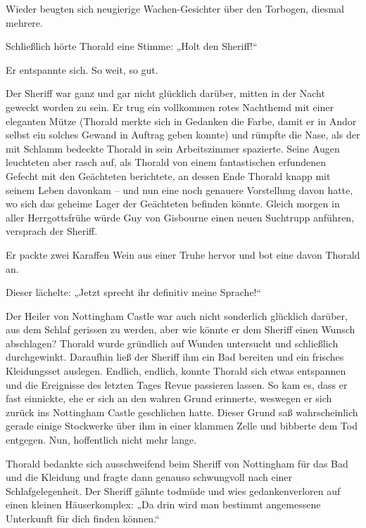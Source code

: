 Wieder beugten sich neugierige Wachen-Gesichter über den Torbogen, diesmal mehrere.

Schließlich hörte Thorald eine Stimme: „Holt den Sheriff!“

Er entspannte sich. So weit, so gut.



\trennzeichen



Der Sheriff war ganz und gar nicht glücklich darüber, mitten in der Nacht geweckt worden zu sein. Er trug ein vollkommen rotes Nachthemd mit einer eleganten Mütze (Thorald merkte sich in Gedanken die Farbe, damit er in Andor selbst ein solches Gewand in Auftrag geben konnte) und rümpfte die Nase, als der mit Schlamm bedeckte Thorald in sein Arbeitszimmer spazierte. Seine Augen leuchteten aber rasch auf, als Thorald von einem fantastischen erfundenen Gefecht mit den Geächteten berichtete, an dessen Ende Thorald knapp mit seinem Leben davonkam – und nun eine noch genauere Vorstellung davon hatte, wo sich das geheime Lager der Geächteten befinden könnte. Gleich morgen in aller Herrgottsfrühe würde Guy von Gisbourne einen neuen Suchtrupp anführen, versprach der Sheriff.

Er packte zwei Karaffen Wein aus einer Truhe hervor und bot eine davon Thorald an.

Dieser lächelte: „Jetzt sprecht ihr definitiv meine Sprache!“



\trennzeichen



Der Heiler von Nottingham Castle war auch nicht sonderlich glücklich darüber, aus dem Schlaf gerissen zu werden, aber wie könnte er dem Sheriff einen Wunsch abschlagen? Thorald wurde gründlich auf Wunden untersucht und schließlich durchgewinkt. Daraufhin ließ der Sheriff ihm ein Bad bereiten und ein frisches Kleidungsset auslegen. Endlich, endlich, konnte Thorald sich etwas entspannen und die Ereignisse des letzten Tages Revue passieren lassen. So kam es, dass er fast einnickte, ehe er sich an den wahren Grund erinnerte, weswegen er sich zurück ins Nottingham Castle geschlichen hatte. Dieser Grund saß wahrscheinlich gerade einige Stockwerke über ihm in einer klammen Zelle und bibberte dem Tod entgegen. Nun, hoffentlich nicht mehr lange.

Thorald bedankte sich ausschweifend beim Sheriff von Nottingham für das Bad und die Kleidung und fragte dann genauso schwungvoll nach einer Schlafgelegenheit. Der Sheriff gähnte todmüde und wies gedankenverloren auf einen kleinen Häuserkomplex: „Da drin wird man bestimmt angemessene Unterkunft für dich finden können.“

